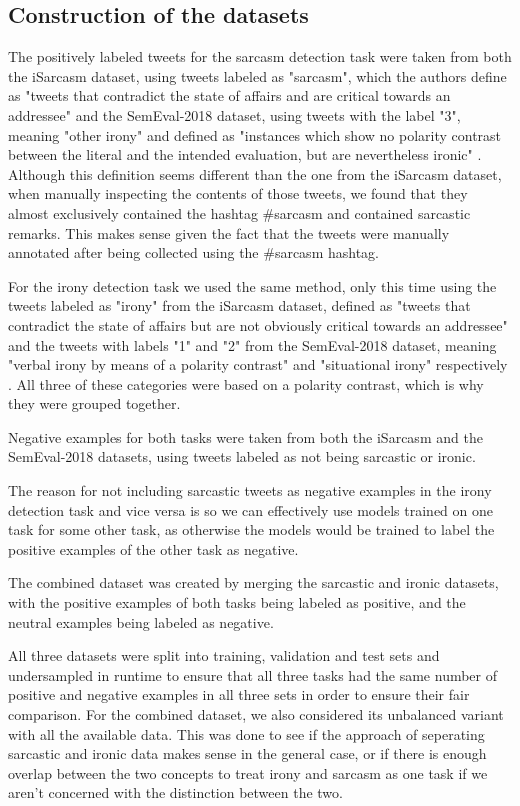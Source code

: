 \documentclass[10pt, a4paper]{article}
\begin{document}
\subsection{Construction of the datasets}\label{sec:dataset_construction}

The positively labeled tweets for the sarcasm detection task were taken from both the iSarcasm dataset, using tweets labeled
as "sarcasm", which the authors define as "tweets that contradict the state of affairs and are critical towards an addressee"
\citep{iSarcasm} and the SemEval-2018 dataset, using tweets with the label "3", meaning "other irony" and defined as "instances
which show no polarity contrast between the literal and the intended evaluation, but are nevertheless ironic" 
\citep{semeval-2018}. Although this definition seems different than the one from the iSarcasm dataset, when manually
inspecting the contents of those tweets, we found that they almost exclusively contained the hashtag \#sarcasm and contained
sarcastic remarks. This makes sense given the fact that the tweets were manually annotated after being collected using the
\#sarcasm hashtag.

For the irony detection task we used the same method, only this time using the tweets labeled as "irony" from the iSarcasm
dataset, defined as "tweets that contradict the state of affairs but are not obviously critical towards an
addressee" \citep{iSarcasm} and the tweets with labels "1" and "2" from the SemEval-2018 dataset, meaning "verbal irony by means 
of a polarity contrast" and "situational irony" respectively \citep{semeval-2018}. All three of these categories were based
on a polarity contrast, which is why they were grouped together.

Negative examples for both tasks were taken from both the iSarcasm and the SemEval-2018 datasets, using tweets labeled as
not being sarcastic or ironic.

The reason for not including sarcastic tweets as negative examples in the irony detection task and vice versa is so we
can effectively use models trained on one task for some other task, as otherwise the models would be trained
to label the positive examples of the other task as negative.

The combined dataset was created by merging the sarcastic and ironic datasets, with the positive examples of both tasks
being labeled as positive, and the neutral examples being labeled as negative.

All three datasets were split into training, validation and test sets and undersampled in runtime to ensure that all three
tasks had the same number of positive and negative examples in all three sets in order to ensure their fair comparison. For
the combined dataset, we also considered its unbalanced variant with all the available data. This was done to see if the 
approach of seperating sarcastic and ironic data makes sense in the general case, or if there is enough overlap between 
the two concepts to treat irony and sarcasm as one task if we aren't concerned with the distinction between the two.
\end{document}
